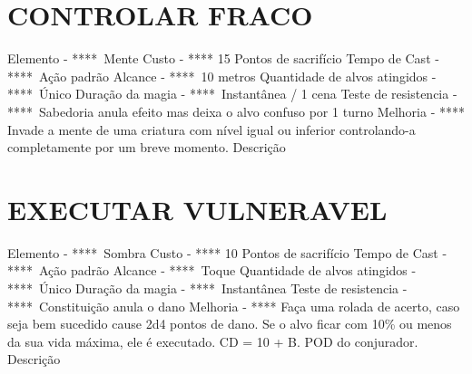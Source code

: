 \documentclass{article}%
\begin{document}
%
\section{CONTROLAR FRACO}%
\label{sec:CONTROLARFRACO}%
Elemento {-} ****~Mente\newline%
Custo {-} **** 15 Pontos de sacrifício\newline%
Tempo de Cast {-} ****~Ação padrão\newline%
Alcance {-} ****~10 metros\newline%
Quantidade de alvos atingidos {-} ****~Único\newline%
Duração da magia {-} ****~Instantânea / 1 cena\newline%
Teste de resistencia {-} ****~Sabedoria anula efeito mas deixa o alvo confuso por 1 turno\newline%
Melhoria {-} **** Invade a mente de uma criatura com nível igual ou inferior controlando{-}a completamente por um breve momento.\newline%
Descrição \newline%

%
\section{EXECUTAR VULNERAVEL}%
\label{sec:EXECUTARVULNERAVEL}%
Elemento {-} ****~Sombra\newline%
Custo {-} **** 10 Pontos de sacrifício\newline%
Tempo de Cast {-} ****~Ação padrão\newline%
Alcance {-} ****~Toque\newline%
Quantidade de alvos atingidos {-} ****~Único\newline%
Duração da magia {-} ****~Instantânea\newline%
Teste de resistencia {-} ****~Constituição anula o dano\newline%
Melhoria {-} **** Faça uma rolada de acerto, caso seja bem sucedido cause 2d4 pontos de dano. Se o alvo ficar com 10\% ou menos da sua vida máxima, ele é executado. CD = 10 + B. POD do conjurador.\newline%
Descrição \newline%

%
\end{document}
